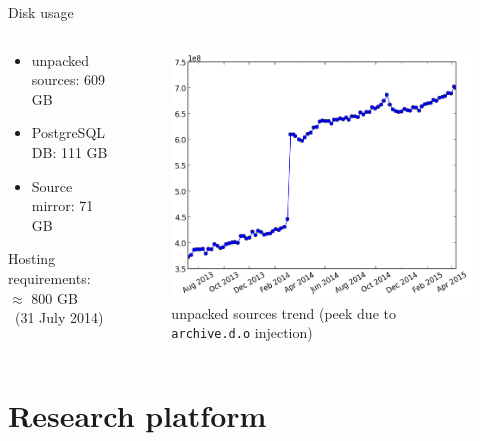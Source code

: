 \documentclass{beamer}
\begin{document}
\begin{frame}{Disk usage}
  \begin{columns}
    \begin{column}{0.5\textwidth}
      \begin{itemize}
      \item unpacked sources: \hfill 609 GB
      \item PostgreSQL DB: \hfill 111 GB
      \item Source mirror: \hfill 71 GB
      \end{itemize}
      \alert{Hosting requirements}: \hfill $\approx$ 800
      GB\\[1ex]
      ~\hfill {\footnotesize (31 July 2014)}
    \end{column}
    \pause
    \begin{column}{0.5\textwidth}
      \begin{figure}
        \centering
        \includegraphics[width=\textwidth]{img/disk-usage}
        \caption{unpacked sources trend (peek due to
          \texttt{archive.d.o}
          injection)}
      \end{figure}
    \end{column}
  \end{columns}
\end{frame}

\section{Research platform}
\end{document}
